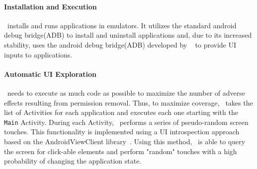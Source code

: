 \paragraph{\bfseries Installation and Execution}
\toolname\ installs and runs applications in emulators.  It utilizes the standard android debug bridge(ADB) to install and uninstall applications and, due to its increased stability, uses the android debug bridge(ADB) developed by ~\cite{Milano} to provide UI inputs to applications.


\paragraph{\bfseries Automatic UI Exploration}
\toolname\ needs to execute as much code as possible to maximize the number of adverse effects resulting from permission removal.  Thus, to maximize coverage, \toolname\ takes the list of Activities for each application and executes each one starting with the \texttt{Main} Activity.  During each Activity, \toolname\ performs a series of pseudo-random screen touches.  This functionality is implemented using a UI introspection approach based on the AndroidViewClient library~\cite{Milano}.  Using this method, \toolname\ is able to query the screen for click-able elements and perform "random" touches with a high probability of changing the application state.      

